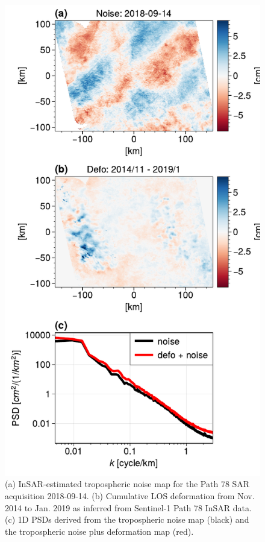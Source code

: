 \begin{figure}[h]
	\centering 
	\includegraphics[height=.9\textheight]{figures/chapter6-blobs/figure_discussion_residual_defo_1col.pdf}
	\caption[Effect of residual deformation on tropospheric noise PSD]{
		(a) InSAR-estimated tropospheric noise map for the Path 78 SAR acquisition 2018-09-14. 
		(b) Cumulative LOS deformation from Nov. 2014 to Jan. 2019 as inferred from Sentinel-1 Path 78 InSAR data.
		(c) 1D PSDs derived from the tropospheric noise map (black) and the tropospheric noise plus deformation map (red).
	}
	\label{fig:discussion-residual-defo}
\end{figure}


